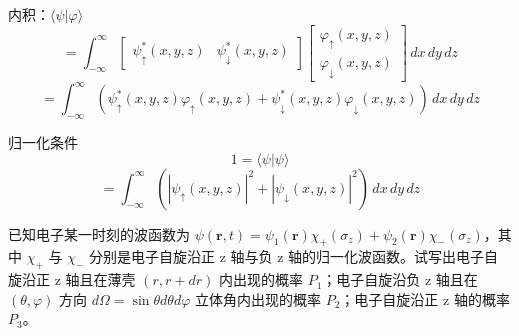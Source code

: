 \documentclass[lang=cn,10pt]{elegantbook}
\begin{document}
\begin{enumerate}
	内积：$\langle \psi | \varphi \rangle$
	\[
	= \int_{-\infty}^{\infty} \begin{bmatrix} \psi_\uparrow^*(x, y, z) & \psi_\downarrow^*(x, y, z) \end{bmatrix} \begin{bmatrix} \varphi_\uparrow(x, y, z) \\ \varphi_\downarrow(x, y, z) \end{bmatrix} \, dx \, dy \, dz
	\]
	\[
	= \int_{-\infty}^{\infty} \left( \psi_\uparrow^*(x, y, z) \varphi_\uparrow(x, y, z) + \psi_\downarrow^*(x, y, z) \varphi_\downarrow(x, y, z) \right) \, dx \, dy \, dz
	\]
	
	归一化条件
	\[
	1 = \langle \psi | \psi \rangle
	\]
	\[
	= \int_{-\infty}^{\infty} \left( |\psi_\uparrow(x, y, z)|^2 + |\psi_\downarrow(x, y, z)|^2 \right) \, dx \, dy \, dz
	\]
\end{enumerate}
\begin{example}
	已知电子某一时刻的波函数为 $\psi(\mathbf{r}, t) = \psi_1(\mathbf{r}) \chi_+(\sigma_z) + \psi_2(\mathbf{r}) \chi_-(\sigma_z)$，其中 $\chi_+$ 与 $\chi_-$ 分别是电子自旋沿正 z 轴与负 z 轴的归一化波函数。试写出电子自旋沿正 z 轴且在薄壳 $(r, r + dr)$ 内出现的概率 $P_1$；电子自旋沿负 z 轴且在 $(\theta, \varphi)$ 方向 $d\Omega = \sin\theta d\theta d\varphi$ 立体角内出现的概率 $P_2$；电子自旋沿正 z 轴的概率 $P_3$。
\end{example}
\end{document}
